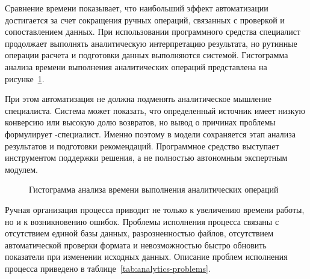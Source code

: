 Сравнение времени показывает, что наибольший эффект автоматизации достигается за счет сокращения ручных операций, связанных с проверкой и сопоставлением данных. При использовании программного средства специалист продолжает выполнять аналитическую интерпретацию результата, но рутинные операции расчета и подготовки данных выполняются системой. Гистограмма анализа времени выполнения аналитических операций представлена на рисунке~\ref{fig:analytics-time-histogram}.

При этом автоматизация не должна подменять аналитическое мышление специалиста. Система может показать, что определенный источник имеет низкую конверсию или высокую долю возвратов, но вывод о причинах проблемы формулирует -специалист. Именно поэтому в модели  сохраняется этап анализа результатов и подготовки рекомендаций. Программное средство выступает инструментом поддержки решения, а не полностью автономным экспертным модулем.

\begin{figure}[H]
    \centering
    \caption{Гистограмма анализа времени выполнения аналитических операций}
    \label{fig:analytics-time-histogram}
\end{figure}

Ручная организация процесса приводит не только к увеличению времени работы, но и к возникновению ошибок. Проблемы исполнения процесса связаны с отсутствием единой базы данных, разрозненностью файлов, отсутствием автоматической проверки формата и невозможностью быстро обновить показатели при изменении исходных данных. Описание проблем исполнения процесса приведено в таблице~\ref{tab:analytics-problems}.

